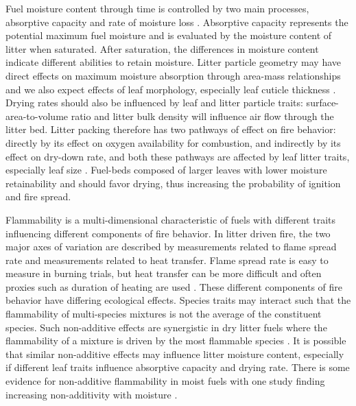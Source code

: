 \documentclass[letterpaper,12pt]{article}
\begin{document}
Fuel moisture content through time is controlled by two main processes,
absorptive capacity and rate of moisture loss \citep{Kreye+Kobziar+etal-2013}.
Absorptive capacity represents the potential maximum fuel moisture and is
evaluated by the moisture content of litter when saturated. After saturation,
the differences in moisture content indicate different abilities to retain
moisture. Litter particle geometry may have direct effects on maximum moisture
absorption through area-mass relationships and we also expect effects of leaf
morphology, especially leaf cuticle thickness \citep{Van_Wagner-1969}. Drying
rates should also be influenced by leaf and litter particle traits:
surface-area-to-volume ratio and litter bulk density will influence air flow
through the litter bed. Litter packing therefore has two pathways of effect on
fire behavior: directly by its effect on oxygen availability for combustion,
and indirectly by its effect on dry-down rate, and both these pathways are
affected by leaf litter traits, especially leaf size
\citep{Scarff+Westoby-2006}. Fuel-beds composed of larger leaves with lower
moisture retainability and should favor drying, thus increasing the probability
of ignition and fire spread.

Flammability is a multi-dimensional characteristic of fuels
\citep{Schwilk-2015, Pausas+Keeley+etal-2017} with different traits influencing
different components of fire behavior. In litter driven fire, the two major
axes of variation are described by measurements related to flame spread rate
and measurements related to heat transfer. Flame spread rate is easy to measure
in burning trials, but heat transfer can be more difficult and often proxies
such as duration of heating are used \citep{Magalhaes+Schwilk-2012,
  Varner+Kane+etal-2015}. These different components of fire behavior have
differing ecological effects. Species traits may interact such that the
flammability of multi-species mixtures is not the average of the constituent
species. Such non-additive effects are synergistic in dry litter fuels where
the flammability of a mixture is driven by the most flammable species
\citep{VanAltena+Logtestjin+etal-2012, Magalhaes+Schwilk-2012}. It is possible
that similar non-additive effects may influence litter moisture content,
especially if different leaf traits influence absorptive capacity and drying
rate. There is some evidence for non-additive flammability in moist fuels with
one study finding increasing non-additivity with moisture
\citep{Blauw+Wensink+etal-2015}.
\end{document}
